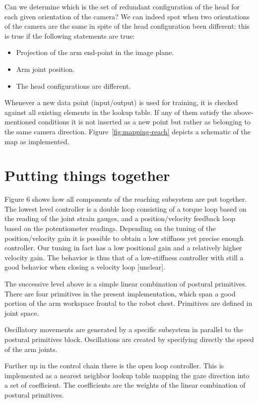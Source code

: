\ifverbose
Can we determine which is the set of redundant configuration of the
head for each given orientation of the camera? We can indeed spot when
two orientations of the camera are the same in spite of the head
configuration been different: this is true if the following statements
are true:
%
\begin{itemize}
%
\item Projection of the arm end-point in the image plane.
%
\item Arm joint position.
%
\item The head configurations are different.
%
\end{itemize}
%
Whenever a new data point (input/output) is used for training, it is
checked against all existing elements in the lookup table. If any of
them satisfy the above-mentioned conditions it is not inserted as a
new point but rather as belonging to the same camera direction.
Figure~\ref{fig:mapping-reach} depicts a schematic of the map as
implemented.

\fi

\ifverbose
\section{Putting things together}

Figure 6 shows how all components of the reaching subsystem are put
together. The lowest level controller is a double loop consisting of a
torque loop based on the reading of the joint strain gauges, and a
position/velocity feedback loop based on the potentiometer readings.
Depending on the tuning of the position/velocity gain it is possible
to obtain a low stiffness yet precise enough controller. Our tuning in
fact has a low positional gain and a relatively higher velocity gain.
The behavior is thus that of a low-stiffness controller with still a
good behavior when closing a velocity loop [unclear].

The successive level above is a simple linear combination of postural
primitives. There are four primitives in the present implementation,
which span a good portion of the arm workspace frontal to the robot
chest. Primitives are defined in joint space.

Oscillatory movements are generated by a specific subsystem in
parallel to the postural primitives block. Oscillations are created by
specifying directly the speed of the arm joints.

Further up in the control chain there is the open loop controller.
This is implemented as a nearest neighbor lookup table mapping the
gaze direction into a set of coefficient. The coefficients are the
weights of the linear combination of postural primitives.

